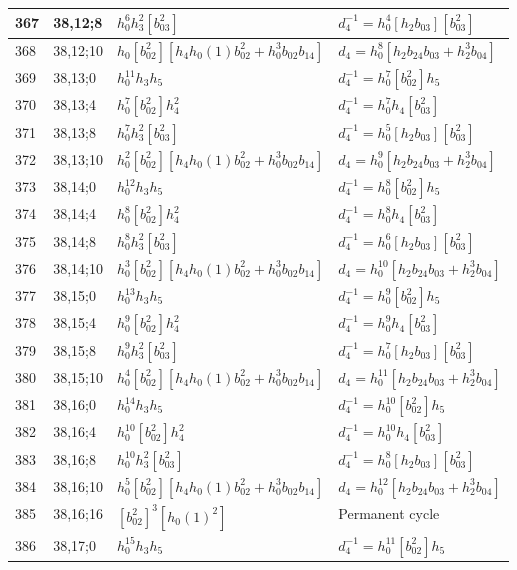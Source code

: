 \documentclass{article}
\begin{document}
\begin{longtable}{|l|l|>{\raggedright\arraybackslash}p{6cm}|>{\raggedright\arraybackslash}p{6cm}|}
\hline
367 & 38,12;8 & $h_0^6h_3^2[b_{03}^2]$ & $d_{4}^{-1}=h_0^4[h_2b_{03}][b_{03}^2]$\\
\hline
368 & 38,12;10 & $h_0[b_{02}^2][h_4h_0(1)b_{02}^2 + h_0^3b_{02}b_{14}]$ &$d_{4}=h_0^8[h_2b_{24}b_{03} + h_2^3b_{04}]$\\
\hline
369 & 38,13;0 & $h_0^{11}h_3h_5$ & $d_{4}^{-1}=h_0^7[b_{02}^2]h_5$\\
\hline
370 & 38,13;4 & $h_0^7[b_{02}^2]h_4^2$ & $d_{4}^{-1}=h_0^7h_4[b_{03}^2]$\\
\hline
371 & 38,13;8 & $h_0^7h_3^2[b_{03}^2]$ & $d_{4}^{-1}=h_0^5[h_2b_{03}][b_{03}^2]$\\
\hline
372 & 38,13;10 & $h_0^2[b_{02}^2][h_4h_0(1)b_{02}^2 + h_0^3b_{02}b_{14}]$ &$d_{4}=h_0^9[h_2b_{24}b_{03} + h_2^3b_{04}]$\\
\hline
373 & 38,14;0 & $h_0^{12}h_3h_5$ & $d_{4}^{-1}=h_0^8[b_{02}^2]h_5$\\
\hline
374 & 38,14;4 & $h_0^8[b_{02}^2]h_4^2$ & $d_{4}^{-1}=h_0^8h_4[b_{03}^2]$\\
\hline
375 & 38,14;8 & $h_0^8h_3^2[b_{03}^2]$ & $d_{4}^{-1}=h_0^6[h_2b_{03}][b_{03}^2]$\\
\hline
376 & 38,14;10 & $h_0^3[b_{02}^2][h_4h_0(1)b_{02}^2 + h_0^3b_{02}b_{14}]$ &$d_{4}=h_0^{10}[h_2b_{24}b_{03} + h_2^3b_{04}]$\\
\hline
377 & 38,15;0 & $h_0^{13}h_3h_5$ & $d_{4}^{-1}=h_0^9[b_{02}^2]h_5$\\
\hline
378 & 38,15;4 & $h_0^9[b_{02}^2]h_4^2$ & $d_{4}^{-1}=h_0^9h_4[b_{03}^2]$\\
\hline
379 & 38,15;8 & $h_0^9h_3^2[b_{03}^2]$ & $d_{4}^{-1}=h_0^7[h_2b_{03}][b_{03}^2]$\\
\hline
380 & 38,15;10 & $h_0^4[b_{02}^2][h_4h_0(1)b_{02}^2 + h_0^3b_{02}b_{14}]$ &$d_{4}=h_0^{11}[h_2b_{24}b_{03} + h_2^3b_{04}]$\\
\hline
381 & 38,16;0 & $h_0^{14}h_3h_5$ & $d_{4}^{-1}=h_0^{10}[b_{02}^2]h_5$\\
\hline
382 & 38,16;4 & $h_0^{10}[b_{02}^2]h_4^2$ & $d_{4}^{-1}=h_0^{10}h_4[b_{03}^2]$\\
\hline
383 & 38,16;8 & $h_0^{10}h_3^2[b_{03}^2]$ & $d_{4}^{-1}=h_0^8[h_2b_{03}][b_{03}^2]$\\
\hline
384 & 38,16;10 & $h_0^5[b_{02}^2][h_4h_0(1)b_{02}^2 + h_0^3b_{02}b_{14}]$ &$d_{4}=h_0^{12}[h_2b_{24}b_{03} + h_2^3b_{04}]$\\
\hline
385 & 38,16;16 & $[b_{02}^2]^3[h_0(1)^2]$ & Permanent cycle\\
\hline
386 & 38,17;0 & $h_0^{15}h_3h_5$ & $d_{4}^{-1}=h_0^{11}[b_{02}^2]h_5$\\

\end{longtable}
\end{document}
